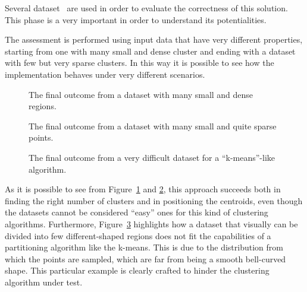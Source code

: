 \label{experiments}
Several dataset~\cite{ClusteringDatasets} are used in order to evaluate the correctness
of this solution. This phase is a very important in order to understand its potentialities.

The assessment is performed using input data that have very different properties,
starting from one with many small and dense cluster and ending with a dataset with few
but very sparse clusters. In this way it is possible to see how the implementation
behaves under very different scenarios.

\begin{figure}[t]
  \caption{The final outcome from a dataset with many small and dense regions.}
  \label{dataset1}
\end{figure}

\begin{figure}[t]
  \caption{The final outcome from a dataset with many small and quite sparse points.}
  \label{dataset2}
\end{figure}

\begin{figure}[t]
  \caption{The final outcome from a very difficult dataset for a ``k-means''-like algorithm.}
  \label{dataset3}
\end{figure}

As it is possible to see from Figure~\ref{dataset1} and \ref{dataset2}, this approach
succeeds both in finding the right number of clusters and in positioning the centroids, even
though the datasets cannot be considered ``easy'' ones for this kind of clustering
algorithms.
Furthermore, Figure~\ref{dataset3} highlights how a dataset that visually can be
divided into few different-shaped regions does not fit the capabilities of a partitioning
algorithm like the k-means. This is due to the distribution from which the points are
sampled, which are far from being a smooth bell-curved shape.
This particular example is clearly crafted to hinder the clustering algorithm under test.
